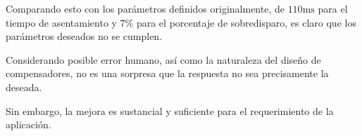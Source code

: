 \documentclass[12pt,a4paper]{article}
\begin{document}
    Comparando esto con los parámetros definidos originalmente, de \( 110\si{\milli\second} \) para el tiempo de asentamiento
    y \( 7 \)\% para el porcentaje de sobredisparo, es claro que los parámetros deseados no se cumplen. 

    Considerando posible error humano, así como la naturaleza del diseño de compensadores, no es una sorpresa que la respuesta 
    no sea precisamente la deseada. 

    Sin embargo, la mejora es sustancial y suficiente para el requerimiento de la aplicación. 
\end{document}
